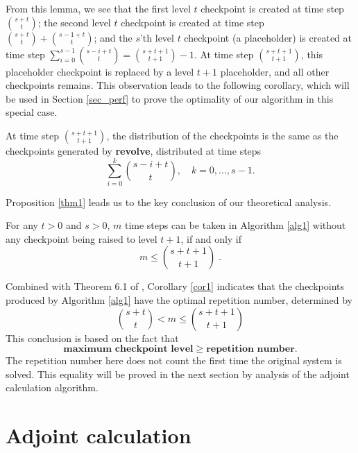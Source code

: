 \documentclass[oneeqnum, onethmnum, onefignum, onetabnum]{siamltex}
\begin{document}
From this lemma, we see that the first level $t$ checkpoint is created
at time step $\binom{s+t}{t}$; the second level $t$ checkpoint
is created at time step
$\binom{s+t}{t} + \binom{s-1+t}{t}$;
and the $s$'th level $t$ checkpoint (a placeholder) is created
at time step $\sum_{i=0}^{s-1}\binom{s-i+t}{t} =
\binom{s + t + 1}{t + 1} - 1$.  At time step
$\binom{s + t + 1}{t + 1}$, this placeholder checkpoint is replaced
by a level $t+1$ placeholder, and all other checkpoints remains.
This observation leads to the
following corollary, which will be used in Section \ref{sec_perf} to prove the
optimality of our algorithm in this special case.

\begin{corollary} \label{cor0}
At time step $\binom{s + t + 1}{t + 1}$, the distribution of
the checkpoints is the same as the checkpoints generated by {\bf revolve},
distributed at time steps
\[ \sum_{i=0}^{k}\binom{s-i+t}{t}, \quad k=0,\ldots,s-1 .\]
\end{corollary}

Proposition \ref{thm1}
leads us to the key conclusion of our theoretical analysis.

\begin{corollary} \label{cor1}
    For any $t > 0$ and $s > 0$, $m$ time steps can be taken in
    Algorithm \ref{alg1} without any checkpoint being raised to level $t+1$,
    if and only if \[ m \le \binom{s + t+1}{t+1} \;.\]
\end{corollary}

Combined with Theorem 6.1 of \cite{griewank92},
Corollary \ref{cor1} indicates that the checkpoints produced by Algorithm
\ref{alg1} have the optimal repetition number, determined by
\[ \binom{s + t}{t} < m \le \binom{s + t+1}{t+1} \]
This conclusion is based on the fact that
\begin{equation} \label{eqn1}
\textbf{maximum checkpoint level} \ge \textbf{repetition number}.
\end{equation}
The repetition number here does not count the first time the
original system is solved.  This equality will be proved in the next section by
analysis of the adjoint calculation algorithm.





\section{Adjoint calculation} \label{sec_adj}
\end{document}
